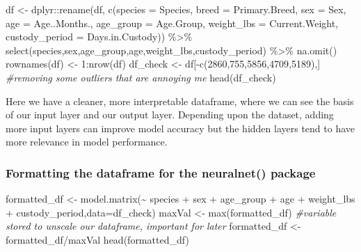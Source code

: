 \documentclass[
]{article}
\newenvironment{Shaded}{\begin{snugshade}}{\end{snugshade}}
\newcommand{\AttributeTok}[1]{\textcolor[rgb]{0.77,0.63,0.00}{#1}}
\newcommand{\CommentTok}[1]{\textcolor[rgb]{0.56,0.35,0.01}{\textit{#1}}}
\newcommand{\DecValTok}[1]{\textcolor[rgb]{0.00,0.00,0.81}{#1}}
\newcommand{\FunctionTok}[1]{\textcolor[rgb]{0.00,0.00,0.00}{#1}}
\newcommand{\NormalTok}[1]{#1}
\newcommand{\OtherTok}[1]{\textcolor[rgb]{0.56,0.35,0.01}{#1}}
\newcommand{\SpecialCharTok}[1]{\textcolor[rgb]{0.00,0.00,0.00}{#1}}
\begin{document}
\begin{Shaded}
\begin{Highlighting}[]
\NormalTok{df }\OtherTok{\textless{}{-}}\NormalTok{ dplyr}\SpecialCharTok{::}\FunctionTok{rename}\NormalTok{(df, }\FunctionTok{c}\NormalTok{(}\AttributeTok{species =}\NormalTok{ Species,}
                          \AttributeTok{breed =}\NormalTok{ Primary.Breed,}
                          \AttributeTok{sex =}\NormalTok{ Sex,}
                          \AttributeTok{age =}\NormalTok{ Age..Months.,}
                          \AttributeTok{age\_group =}\NormalTok{ Age.Group,}
                          \AttributeTok{weight\_lbs =}\NormalTok{ Current.Weight,}
                          \AttributeTok{custody\_period =}\NormalTok{ Days.in.Custody)) }\SpecialCharTok{\%\textgreater{}\%}
  \FunctionTok{select}\NormalTok{(species,sex,age\_group,age,weight\_lbs,custody\_period) }\SpecialCharTok{\%\textgreater{}\%} 
  \FunctionTok{na.omit}\NormalTok{()}
\FunctionTok{rownames}\NormalTok{(df) }\OtherTok{\textless{}{-}} \DecValTok{1}\SpecialCharTok{:}\FunctionTok{nrow}\NormalTok{(df)}
\NormalTok{df\_check }\OtherTok{\textless{}{-}}\NormalTok{ df[}\SpecialCharTok{{-}}\FunctionTok{c}\NormalTok{(}\DecValTok{2860}\NormalTok{,}\DecValTok{755}\NormalTok{,}\DecValTok{5856}\NormalTok{,}\DecValTok{4709}\NormalTok{,}\DecValTok{5189}\NormalTok{),] }\CommentTok{\#removing some outliers that are annoying me}
\FunctionTok{head}\NormalTok{(df\_check)}
\end{Highlighting}
\end{Shaded}

Here we have a cleaner, more interpretable dataframe, where we can see
the basis of our input layer and our output layer. Depending upon the
dataset, adding more input layers can improve model accuracy but the
hidden layers tend to have more relevance in model performance.

\hypertarget{formatting-the-dataframe-for-the-neuralnet-package}{%
\subsubsection{Formatting the dataframe for the neuralnet()
package}\label{formatting-the-dataframe-for-the-neuralnet-package}}

\begin{Shaded}
\begin{Highlighting}[]
\NormalTok{formatted\_df }\OtherTok{\textless{}{-}} \FunctionTok{model.matrix}\NormalTok{(}\SpecialCharTok{\textasciitilde{}}\NormalTok{ species }\SpecialCharTok{+}\NormalTok{ sex }\SpecialCharTok{+}\NormalTok{ age\_group }\SpecialCharTok{+}\NormalTok{ age }\SpecialCharTok{+}\NormalTok{ weight\_lbs }\SpecialCharTok{+}\NormalTok{ custody\_period,}\AttributeTok{data=}\NormalTok{df\_check)}
\NormalTok{maxVal }\OtherTok{\textless{}{-}} \FunctionTok{max}\NormalTok{(formatted\_df) }\CommentTok{\#variable stored to unscale our dataframe, important for later}
\NormalTok{formatted\_df }\OtherTok{\textless{}{-}}\NormalTok{ formatted\_df}\SpecialCharTok{/}\NormalTok{maxVal}
\FunctionTok{head}\NormalTok{(formatted\_df)}
\end{Highlighting}
\end{Shaded}
\end{document}
